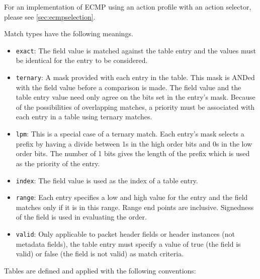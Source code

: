 \documentclass[12pt]{article}
\begin{document}
For an implementation of ECMP using an action profile with an action selector,
please see \ref{sec:ecmpselection}.

Match types have the following meanings.

\begin{itemize}
\item
\texttt{exact}: The field value is matched against the table entry and the values 
must be identical for the entry to be considered.
\item
\texttt{ternary}:  A mask provided with each entry in the table. This mask is ANDed 
with the field value before a comparison is made.  The field value and the 
table entry value need only agree on the bits set in the entry's mask.  Because 
of the possibilities of overlapping matches, a priority must be associated 
with each entry in a table using ternary matches.
\item
\texttt{lpm}:  This is a special case of a ternary match. Each entry's mask selects 
a prefix by having a divide between 1s in the high order bits and 0s in the 
low order bits. The number of 1 bits gives the length of the prefix which 
is used as the priority of the entry.
\item
\texttt{index}: The field value is used as the index of a table entry.
\item
\texttt{range}: Each entry specifies a low and high value for the entry and the field 
matches only if it is in this range. Range end points are inclusive. Signedness 
of the field is used in evaluating the order.
\item
\texttt{valid}: Only applicable to packet header fields or header instances (not metadata 
fields), the table entry must specify a value of true (the field is valid) 
or false (the field is not valid) as match criteria.
\end{itemize}

Tables are defined and applied with the following conventions:
\end{document}
